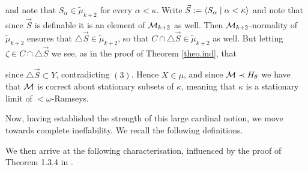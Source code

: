 \documentclass[../main]{subfiles}
\begin{document}
{	and note that $S_\alpha\in\tilde\mu_{k+2}$ for every $\alpha<\kappa$. Write $\vec S:=\langle S_\alpha\mid\alpha<\kappa\rangle$ and note that since $\vec S$ is definable it is an element of $\operatorname{\mathcal M}_{k+2}$ as well. Then $\operatorname{\mathcal M}_{k+2}$-normality of $\tilde\mu_{k+2}$ ensures that $\triangle\vec S\in\tilde\mu_{k+2}$, so that $C\cap\triangle\vec S\in\tilde\mu_{k+2}$ as well. But letting $\zeta\in C\cap\triangle\vec S$ we see, as in the proof of Theorem \ref{theo.ind}, that

	since $\triangle\vec S\subset Y$, contradicting $(3)$. Hence $X\in\mu$, and since $\operatorname{\mathcal M}\prec H_\theta$ we have that $\operatorname{\mathcal M}$ is correct about stationary subsets of $\kappa$, meaning that $\kappa$ is a stationary limit of ${<}\omega$-Ramseys.
}

Now, having established the strength of this large cardinal notion, we move towards complete ineffability. We recall the following definitions.



We then arrive at the following characterisation, influenced by the proof of Theorem 1.3.4 in \cite{Abramson}.
\end{document}

